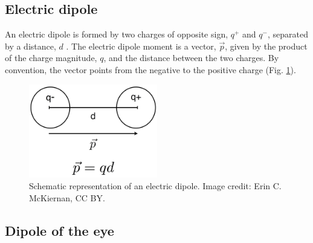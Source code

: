 \documentclass[12pt]{article}
\begin{document}

\subsection*{Electric dipole}

An electric dipole is formed by two charges of opposite sign, $q^+$ and $q^-$, separated by a distance, $d$ \cite{hyperphysicsDipole}. The electric dipole moment is a vector, $\vec{p}$, given by the product of the charge magnitude, $q$, and the distance between the two charges. By convention, the vector points from the negative to the positive charge (Fig. \ref{fig:dipole}). 

\begin{figure}[h!]
\centering
\includegraphics[width=0.5\textwidth]{images/dipole.png}
\caption{Schematic representation of an electric dipole. Image credit: Erin C. McKiernan, CC BY.}
\label{fig:dipole}
\end{figure}

\subsection*{Dipole of the eye}
\end{document}
